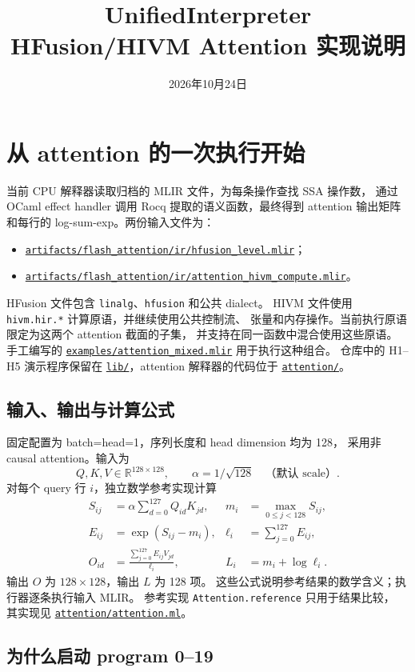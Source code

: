 \documentclass[UTF8,a4paper,11pt,fontset=fandol]{ctexart}
\title{UnifiedInterpreter\\HFusion/HIVM Attention 实现说明}
\author{}
\date{2026年10月24日}
\newcommand{\code}{\nolinkurl}
\newcommand{\src}[1]{\href{run:../#1}{\nolinkurl{#1}}}
\begin{document}
\maketitle
\vspace{-1.5em}

\section{从 attention 的一次执行开始}

当前 CPU 解释器读取归档的 MLIR 文件，为每条操作查找 SSA 操作数，
通过 OCaml effect handler 调用 Rocq 提取的语义函数，最终得到 attention
输出矩阵和每行的 log-sum-exp。两份输入文件为：
\begin{itemize}
  \item \src{artifacts/flash_attention/ir/hfusion_level.mlir}；
  \item \src{artifacts/flash_attention/ir/attention_hivm_compute.mlir}。
\end{itemize}
HFusion 文件包含 \code{linalg}、\code{hfusion} 和公共 dialect。
HIVM 文件使用 \code{hivm.hir.*} 计算原语，并继续使用公共控制流、
张量和内存操作。当前执行原语限定为这两个 attention 截面的子集，
并支持在同一函数中混合使用这些原语。
手工编写的 \src{examples/attention_mixed.mlir} 用于执行这种组合。
仓库中的 H1--H5 演示程序保留在 \src{lib/}，attention 解释器的代码位于
\src{attention/}。

\subsection{输入、输出与计算公式}

固定配置为 batch=head=1，序列长度和 head dimension 均为 128，
采用非 causal attention。输入为
\[
  Q,K,V\in\mathbb{R}^{128\times128},\qquad
  \alpha=1/\sqrt{128}\quad\text{（默认 scale）}.
\]
对每个 query 行 $i$，独立数学参考实现计算
\begin{align}
  S_{ij}&=\alpha\sum_{d=0}^{127} Q_{id}K_{jd},&
  m_i&=\max_{0\le j<128}S_{ij},\\
  E_{ij}&=\exp(S_{ij}-m_i),&
  \ell_i&=\sum_{j=0}^{127}E_{ij},\\
  O_{id}&=\frac{\sum_{j=0}^{127}E_{ij}V_{jd}}{\ell_i},&
  L_i&=m_i+\log\ell_i.
\end{align}
输出 $O$ 为 $128\times128$，输出 $L$ 为 128 项。
这些公式说明参考结果的数学含义；执行器逐条执行输入 MLIR。
参考实现 \code{Attention.reference} 只用于结果比较，
其实现见 \src{attention/attention.ml}。

\subsection{为什么启动 program 0--19}
\end{document}
